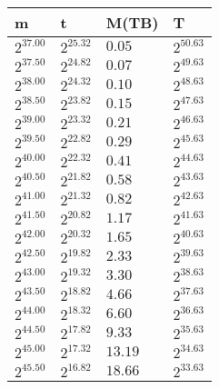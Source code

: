 \begin{tabular}{llll}
m & t & M(TB) & T \\ \hline
$2^{37.00}$ & $2^{25.32}$ & $0.05$ & $2^{50.63}$ \\
$2^{37.50}$ & $2^{24.82}$ & $0.07$ & $2^{49.63}$ \\
$2^{38.00}$ & $2^{24.32}$ & $0.10$ & $2^{48.63}$ \\
$2^{38.50}$ & $2^{23.82}$ & $0.15$ & $2^{47.63}$ \\
$2^{39.00}$ & $2^{23.32}$ & $0.21$ & $2^{46.63}$ \\
$2^{39.50}$ & $2^{22.82}$ & $0.29$ & $2^{45.63}$ \\
$2^{40.00}$ & $2^{22.32}$ & $0.41$ & $2^{44.63}$ \\
$2^{40.50}$ & $2^{21.82}$ & $0.58$ & $2^{43.63}$ \\
$2^{41.00}$ & $2^{21.32}$ & $0.82$ & $2^{42.63}$ \\
$2^{41.50}$ & $2^{20.82}$ & $1.17$ & $2^{41.63}$ \\
$2^{42.00}$ & $2^{20.32}$ & $1.65$ & $2^{40.63}$ \\
$2^{42.50}$ & $2^{19.82}$ & $2.33$ & $2^{39.63}$ \\
$2^{43.00}$ & $2^{19.32}$ & $3.30$ & $2^{38.63}$ \\
$2^{43.50}$ & $2^{18.82}$ & $4.66$ & $2^{37.63}$ \\
$2^{44.00}$ & $2^{18.32}$ & $6.60$ & $2^{36.63}$ \\
$2^{44.50}$ & $2^{17.82}$ & $9.33$ & $2^{35.63}$ \\
$2^{45.00}$ & $2^{17.32}$ & $13.19$ & $2^{34.63}$ \\
$2^{45.50}$ & $2^{16.82}$ & $18.66$ & $2^{33.63}$ \\
\end{tabular}
 \\\\ 
\\\\
